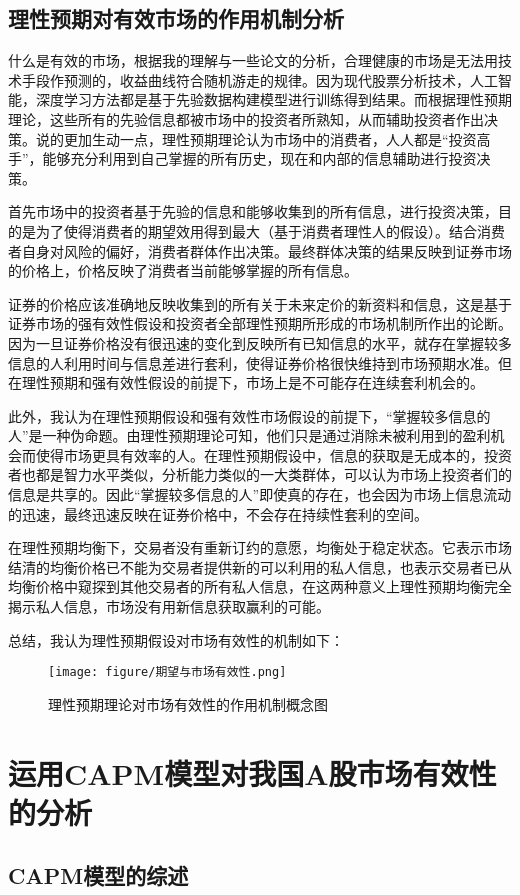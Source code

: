 \documentclass{xjtureport}
\begin{document}
\subsection{理性预期对有效市场的作用机制分析}
什么是有效的市场，根据我的理解与一些论文的分析\cite{}，合理健康的市场是无法用技术手段作预测的，收益曲线符合随机游走的规律。因为现代股票分析技术，人工智能，深度学习方法都是基于先验数据构建模型进行训练得到结果。而根据理性预期理论，这些所有的先验信息都被市场中的投资者所熟知，从而辅助投资者作出决策。说的更加生动一点，理性预期理论认为市场中的消费者，人人都是“投资高手”，能够充分利用到自己掌握的所有历史，现在和内部的信息辅助进行投资决策。
\par 首先市场中的投资者基于先验的信息和能够收集到的所有信息，进行投资决策，目的是为了使得消费者的期望效用得到最大（基于消费者理性人的假设）。结合消费者自身对风险的偏好，消费者群体作出决策。最终群体决策的结果反映到证券市场的价格上，价格反映了消费者当前能够掌握的所有信息。
\par 证券的价格应该准确地反映收集到的所有关于未来定价的新资料和信息，这是基于证券市场的强有效性假设和投资者全部理性预期所形成的市场机制所作出的论断。因为一旦证券价格没有很迅速的变化到反映所有已知信息的水平，就存在掌握较多信息的人利用时间与信息差进行套利，使得证券价格很快维持到市场预期水准。但在理性预期和强有效性假设的前提下，市场上是不可能存在连续套利机会的。
\par 此外，我认为在理性预期假设和强有效性市场假设的前提下，“掌握较多信息的人”是一种伪命题。由理性预期理论可知，他们只是通过消除未被利用到的盈利机会而使得市场更具有效率的人。在理性预期假设中，信息的获取是无成本的，投资者也都是智力水平类似，分析能力类似的一大类群体，可以认为市场上投资者们的信息是共享的。因此“掌握较多信息的人”即使真的存在，也会因为市场上信息流动的迅速，最终迅速反映在证券价格中，不会存在持续性套利的空间。
\par 在理性预期均衡下，交易者没有重新订约的意愿，均衡处于稳定状态。它表示市场结清的均衡价格已不能为交易者提供新的可以利用的私人信息，也表示交易者已从均衡价格中窥探到其他交易者的所有私人信息，在这两种意义上理性预期均衡完全揭示私人信息，市场没有用新信息获取赢利的可能。
\par 总结，我认为理性预期假设对市场有效性的机制如下：
\begin{figure}[H]
    \begin{center}
        \texttt{[image: figure/期望与市场有效性.png]}
    \end{center}
    \caption{理性预期理论对市场有效性的作用机制概念图}
\end{figure}
\clearpage
\section{运用CAPM模型对我国A股市场有效性的分析}
\subsection{CAPM模型的综述}
\end{document}
